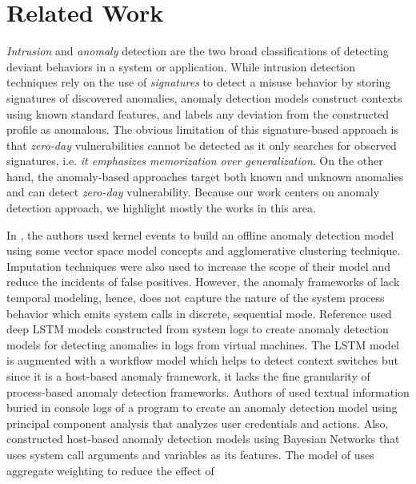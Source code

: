 \section{Related Work}
\label{sec:related-work}
\textit{Intrusion} and \textit{anomaly} detection \cite{chandola2009anomaly,mutz2006anomalous,yuansurveyacmanom} are the two broad classifications of detecting deviant behaviors in a system or application. While 
intrusion detection techniques rely on the use of \emph{signatures} to detect a 
misuse behavior by storing signatures of discovered anomalies, anomaly 
detection models construct contexts using known standard features, and labels 
any deviation from the constructed profile as anomalous. The obvious limitation 
of this signature-based approach is that \emph{zero-day} vulnerabilities cannot 
be detected as it only searches for observed signatures, i.e. \emph{it 
	emphasizes memorization over generalization}. On the other hand, the 
anomaly-based approaches target both known and unknown anomalies and can 
detect \emph{zero-day} vulnerability. Because our work centers on anomaly 
detection approach, we highlight mostly the works in this area. \par 
In \cite{ezeme2017imputation,ezeme2020peskea}, the authors used kernel events to build an offline anomaly 
detection model using some vector space model concepts and agglomerative 
clustering technique. Imputation techniques were also used to increase the 
scope of their model and reduce the incidents of false 
positives. However, the anomaly frameworks of \cite{ezeme2017imputation,ezeme2020peskea} lack temporal modeling, hence, does not capture the nature of the system process behavior which emits system calls in discrete, sequential mode. Reference \cite{du2017deeplog} used deep LSTM models constructed 
from system logs to create anomaly detection models for detecting anomalies in logs from virtual machines. The LSTM model is 
augmented with a workflow model which helps to detect context switches but since it is a host-based anomaly framework, it lacks the fine granularity of process-based anomaly detection frameworks. Authors 
of \cite{xu2009largescale} used textual information buried in console logs 
of a program to create an anomaly detection model 
using principal component analysis that analyzes user credentials and actions. Also, \cite{mutz2006anomalous} constructed 
host-based anomaly detection models using Bayesian Networks that uses system 
call arguments and variables as its features. The model of 
\cite{mutz2006anomalous} uses aggregate weighting to reduce the effect of 

